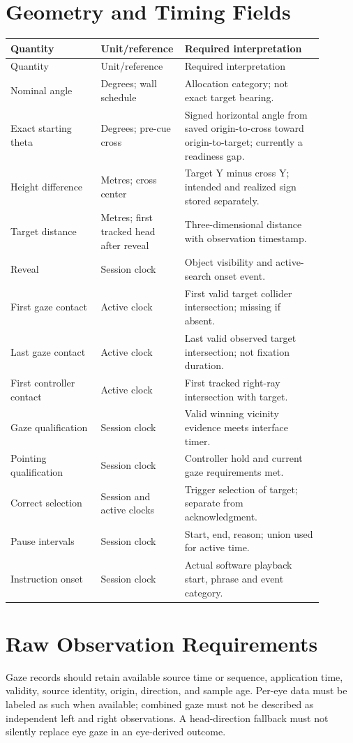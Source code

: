 \section{Geometry and Timing Fields}
\begingroup
{}
\begin{longtable}{@{}p{0.28\linewidth}p{0.18\linewidth}p{0.43\linewidth}@{}}
\toprule
Quantity & Unit/reference & Required interpretation \\\midrule\endfirsthead
\toprule Quantity & Unit/reference & Required interpretation \\\midrule\endhead
Nominal angle & Degrees; wall schedule & Allocation category; not exact target bearing.\\
Exact starting theta & Degrees; pre-cue cross & Signed horizontal angle from saved origin-to-cross toward origin-to-target; currently a readiness gap.\\
Height difference & Metres; cross center & Target Y minus cross Y; intended and realized sign stored separately.\\
Target distance & Metres; first tracked head after reveal & Three-dimensional distance with observation timestamp.\\
Reveal & Session clock & Object visibility and active-search onset event.\\
First gaze contact & Active clock & First valid target collider intersection; missing if absent.\\
Last gaze contact & Active clock & Last valid observed target intersection; not fixation duration.\\
First controller contact & Active clock & First tracked right-ray intersection with target.\\
Gaze qualification & Session clock & Valid winning vicinity evidence meets interface timer.\\
Pointing qualification & Session clock & Controller hold and current gaze requirements met.\\
Correct selection & Session and active clocks & Trigger selection of target; separate from acknowledgment.\\
Pause intervals & Session clock & Start, end, reason; union used for active time.\\
Instruction onset & Session clock & Actual software playback start, phrase and event category.\\\bottomrule
\end{longtable}
\endgroup

\section{Raw Observation Requirements}
Gaze records should retain available source time or sequence, application time, validity, source identity, origin, direction, and sample age. Per-eye data must be labeled as such when available; combined gaze must not be described as independent left and right observations. A head-direction fallback must not silently replace eye gaze in an eye-derived outcome.

